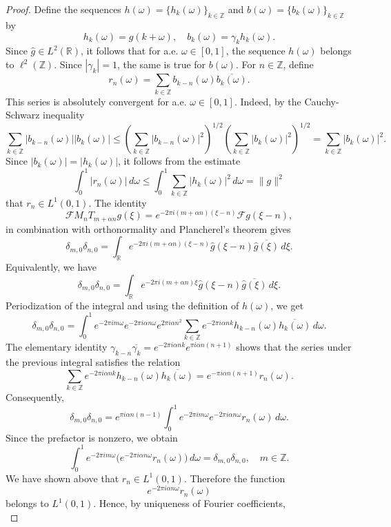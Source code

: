 \documentclass[reqno,a4paper,12pt]{amsart}
\numberwithin{equation}{section}
\def\Z{{\mathbb Z}}
\newcommand{\ft}{{\mathcal{F}}}
\newcommand\1{\mathds{1}}
\begin{document}
\begin{proof}
Define the sequences $h(\omega)=\{h_k(\omega)\}_{k\in\Z}$ and $b(\omega)=\{b_k(\omega)\}_{k\in\Z}$ by
$$
h_k(\omega)=\widehat g(k+\omega), \quad b_k(\omega)=\gamma_k h_k(\omega).
$$
Since $\widehat g\in L^2(\mathbb R)$, it follows that for a.e. $\omega \in [0,1]$, the sequence $h(\omega)$ belongs to $\ell^2(\Z)$. Since $|\gamma_k|=1$, the same is true for $b(\omega)$.
For $n\in\mathbb Z$, define
$$
r_n(\omega) = \sum_{k\in\mathbb Z} b_{k-n}(\omega)\overline{b_k(\omega)}.
$$
This series is absolutely convergent for a.e. $\omega \in [0,1]$. Indeed, by the Cauchy-Schwarz inequality
$$
\sum_{k\in\mathbb Z} |b_{k-n}(\omega)||b_k(\omega)| \leq \left(\sum_{k\in\mathbb Z}|b_{k-n}(\omega)|^2\right)^{1/2} \left(\sum_{k\in\mathbb Z}|b_k(\omega)|^2\right)^{1/2} = \sum_{k\in\mathbb Z}|b_k(\omega)|^2.
$$
Since $|b_k(\omega)|=|h_k(\omega)|$, it follows from the estimate
$$
\int_0^1 |r_n(\omega)| \, d\omega \leq \int_0^1  \sum_{k\in\mathbb Z}|h_k(\omega)|^2 \, d\omega = \| g \|^2
$$
that $r_n \in L^1(0,1)$. The identity
$$
\ft M_nT_{m+\alpha n}g(\xi) = e^{-2\pi i(m+\alpha n)(\xi-n)} \ft g(\xi-n),
$$
in combination with orthonormality and Plancherel's theorem gives
$$
\delta_{m,0}\delta_{n,0} = \int_{\mathbb R} e^{-2\pi i(m+\alpha n)(\xi-n)} \widehat g(\xi-n)\overline{\widehat g(\xi)}\,d\xi .
$$
Equivalently, we have
$$
\delta_{m,0}\delta_{n,0} = \int_{\mathbb R} e^{-2\pi i(m+\alpha n)\xi} \widehat g(\xi-n)\overline{\widehat g(\xi)}\,d\xi .
$$
Periodization of the integral and using the definition of
$h(\omega)$, we get
$$
\delta_{m,0}\delta_{n,0} = \int_0^1 e^{-2\pi i m\omega} e^{-2\pi i\alpha n\omega} e^{2\pi i\alpha n^2} \sum_{k\in\mathbb Z} e^{-2\pi i\alpha nk} h_{k-n}(\omega)\overline{h_k(\omega)} \,d\omega .
$$
The elementary identity $\gamma_{k-n}\overline{\gamma_k} = e^{-2\pi i\alpha nk}e^{\pi i\alpha n(n+1)}$ shows that the series under the previous integral satisfies the relation
$$
\sum_{k\in\mathbb Z} e^{-2\pi i\alpha nk} h_{k-n}(\omega)\overline{h_k(\omega)} = e^{-\pi i\alpha n(n+1)}r_n(\omega).
$$
Consequently,
$$
\delta_{m,0}\delta_{n,0} = e^{\pi i\alpha n(n-1)} \int_0^1 e^{-2\pi i m\omega} e^{-2\pi i\alpha n\omega} r_n(\omega)\,d\omega.
$$
Since the prefactor is nonzero, we obtain
$$
\int_0^1 e^{-2\pi i m\omega} \bigl(e^{-2\pi i\alpha n\omega}r_n(\omega)\bigr) \,d\omega = \delta_{m,0}\delta_{n,0}, \quad  m\in\mathbb Z.
$$
We have shown above that $r_n \in L^1(0,1)$. Therefore the function
$$
e^{-2\pi i\alpha n\omega}r_n(\omega)
$$
belongs to $L^1(0,1)$. Hence, by uniqueness of Fourier coefficients,
$$
$$
\end{proof}
\end{document}
